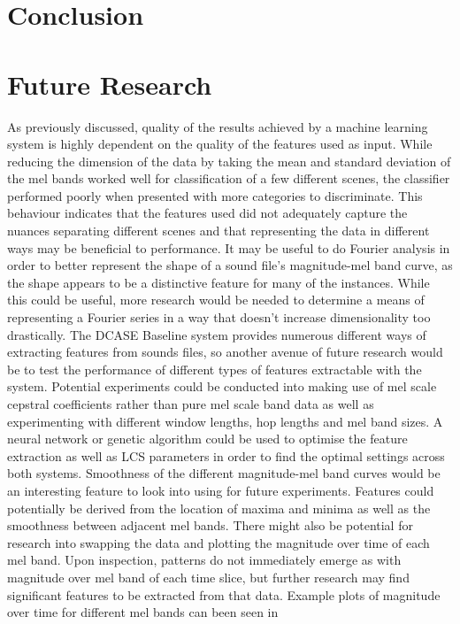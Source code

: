 \documentclass[11pt]{article}
\begin{document}
\begin{multicols}{2}
\section{Conclusion}






\section{Future Research}
As previously discussed, quality of the results achieved by a machine learning system is highly dependent on the quality of the features used as input. While reducing the dimension of the data by taking the mean and standard deviation of the mel bands worked well for classification of a few different scenes, the classifier performed poorly when presented with more categories to discriminate. This behaviour indicates that the features used did not adequately capture the nuances separating different scenes and that representing the data in different ways may be beneficial to performance.
It may be useful to do Fourier analysis in order to better represent the shape of a sound file’s magnitude-mel band curve, as the shape appears to be a distinctive feature for many of the instances. While this could be useful, more research would be needed to determine a means of representing a Fourier series in a way that doesn’t increase dimensionality too drastically. 
The DCASE Baseline system provides numerous different ways of extracting features from sounds files, so another avenue of future research would be to test the performance of different types of features extractable with the system. Potential experiments could be conducted into making use of mel scale cepstral coefficients rather than pure mel scale band data as well as experimenting with different window lengths, hop lengths and mel band sizes. A neural network or genetic algorithm could be used to optimise the feature extraction as well as LCS parameters in order to find the optimal settings across both systems. 
Smoothness of the different magnitude-mel band curves would be an interesting feature to look into using for future experiments. Features could potentially be derived from the location of maxima and minima as well as the smoothness between adjacent mel bands.
There might also be potential for research into swapping the data and plotting the magnitude over time of each mel band. Upon inspection, patterns do not immediately emerge as with magnitude over mel band of each time slice, but further research may find significant features to be extracted from that data. Example plots of magnitude over time for different mel bands can been seen in 





\end{multicols}
\end{document}
